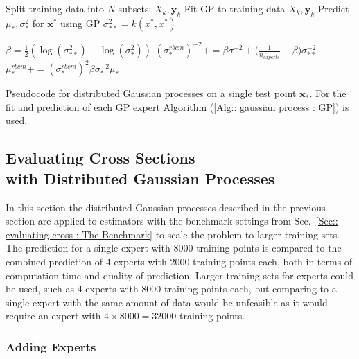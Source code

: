 \documentclass[twoside,english]{uiofysmaster}
\begin{document}
\begin{algorithm}
Split training data into $N$ subsets: $X_k, \textbf{y}_k$\;
{
Fit GP to training data $X_k, \textbf{y}_k$ \;
 Predict $\mu_*,\sigma_*^2 $ for $\textbf{x}^*$ using GP \;
 $\sigma_{**}^2 = k (x^*, x^*)$ \;
}
 
{ 
$\beta = \frac{1}{2} (\log (\sigma_{**}^2) - \log (\sigma_*^2))$ \;
$(\sigma_*^{rbcm})^{-2} += \beta \sigma^{-2} + \big(\frac{1}{n_{experts}} - \beta \big) \sigma_{**}^{-2} $ 
 }  
{ 
$\mu_*^{rbcm} += (\sigma_*^{rbcm})^2 \beta \sigma^{-2}_* \mu_*$
} 
 \caption{Pseudocode for distributed Gaussian processes on a single test point $\textbf{x}_*$. For the fit and prediction of each GP expert Algorithm (\ref{Alg:: gaussian process : GP}) is used.}
\label{Alg:: gaussian process : DGP}
\end{algorithm}


\subsection{Evaluating Cross Sections\\ with Distributed Gaussian Processes}

In this section the distributed Gaussian processes described in the previous section are applied to estimators with the benchmark settings from Sec.~\ref{Sec:: evaluating cross : The Benchmark} to scale the problem to larger training sets. The prediction for a single expert with 8000 training points is compared to the combined prediction of 4 experts with 2000 training points each, both in terms of computation time and quality of prediction. Larger training sets for experts could be used, such as 4 experts with 8000 training points each, but comparing to a single expert with the same amount of data would be unfeasible as it would require an expert with $4 \times 8000 = 32 000$ training points.

\subsubsection{Adding Experts}
\end{document}
